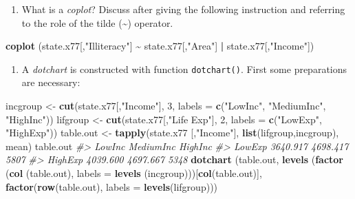 \documentclass[
]{book}
\newenvironment{Shaded}{\begin{snugshade}}{\end{snugshade}}
\newcommand{\AttributeTok}[1]{\textcolor[rgb]{0.13,0.29,0.53}{#1}}
\newcommand{\CommentTok}[1]{\textcolor[rgb]{0.56,0.35,0.01}{\textit{#1}}}
\newcommand{\DecValTok}[1]{\textcolor[rgb]{0.00,0.00,0.81}{#1}}
\newcommand{\FunctionTok}[1]{\textcolor[rgb]{0.13,0.29,0.53}{\textbf{#1}}}
\newcommand{\NormalTok}[1]{#1}
\newcommand{\OtherTok}[1]{\textcolor[rgb]{0.56,0.35,0.01}{#1}}
\newcommand{\SpecialCharTok}[1]{\textcolor[rgb]{0.81,0.36,0.00}{\textbf{#1}}}
\newcommand{\StringTok}[1]{\textcolor[rgb]{0.31,0.60,0.02}{#1}}
\providecommand{\tightlist}{%
  \setlength{\itemsep}{0pt}\setlength{\parskip}{0pt}}
\begin{document}
\begin{enumerate}
\def\labelenumi{(\alph{enumi})}
\setcounter{enumi}{4}
\tightlist
\item
  What is a \emph{{coplot}}? Discuss after giving the following instruction and referring to the role of the tilde (\textasciitilde) operator.
\end{enumerate}

\begin{Shaded}
\begin{Highlighting}[]
\FunctionTok{coplot}\NormalTok{ (state.x77[,}\StringTok{"Illiteracy"}\NormalTok{] }\SpecialCharTok{\textasciitilde{}}\NormalTok{ state.x77[,}\StringTok{"Area"}\NormalTok{] }\SpecialCharTok{|}\NormalTok{ state.x77[,}\StringTok{"Income"}\NormalTok{])}
\end{Highlighting}
\end{Shaded}

\begin{enumerate}
\def\labelenumi{(\alph{enumi})}
\setcounter{enumi}{5}
\tightlist
\item
  A \emph{{dotchart}} is constructed with function \texttt{dotchart()}. First some preparations are necessary:
\end{enumerate}

\begin{Shaded}
\begin{Highlighting}[]
\NormalTok{incgroup }\OtherTok{\textless{}{-}} \FunctionTok{cut}\NormalTok{(state.x77[,}\StringTok{"Income"}\NormalTok{],  }\DecValTok{3}\NormalTok{, }
                \AttributeTok{labels =} \FunctionTok{c}\NormalTok{(}\StringTok{"LowInc"}\NormalTok{, }\StringTok{"MediumInc"}\NormalTok{, }\StringTok{"HighInc"}\NormalTok{))}
\NormalTok{lifgroup }\OtherTok{\textless{}{-}} \FunctionTok{cut}\NormalTok{(state.x77[,}\StringTok{"Life Exp"}\NormalTok{], }\DecValTok{2}\NormalTok{, }
                \AttributeTok{labels =} \FunctionTok{c}\NormalTok{(}\StringTok{"LowExp"}\NormalTok{, }\StringTok{"HighExp"}\NormalTok{))}
\NormalTok{table.out }\OtherTok{\textless{}{-}} \FunctionTok{tapply}\NormalTok{(state.x77 [,}\StringTok{"Income"}\NormalTok{], }\FunctionTok{list}\NormalTok{(lifgroup,incgroup), mean)}
\NormalTok{table.out}
\CommentTok{\#\textgreater{}           LowInc MediumInc HighInc}
\CommentTok{\#\textgreater{} LowExp  3640.917  4698.417    5807}
\CommentTok{\#\textgreater{} HighExp 4039.600  4697.667    5348}
\FunctionTok{dotchart}\NormalTok{ (table.out, }
          \FunctionTok{levels}\NormalTok{ (}\FunctionTok{factor}\NormalTok{ (}\FunctionTok{col}\NormalTok{ (table.out), }
                          \AttributeTok{labels =} \FunctionTok{levels}\NormalTok{ (incgroup)))[}\FunctionTok{col}\NormalTok{(table.out)], }
          \FunctionTok{factor}\NormalTok{(}\FunctionTok{row}\NormalTok{(table.out), }\AttributeTok{labels =} \FunctionTok{levels}\NormalTok{(lifgroup)))}
\end{Highlighting}
\end{Shaded}
\end{document}

